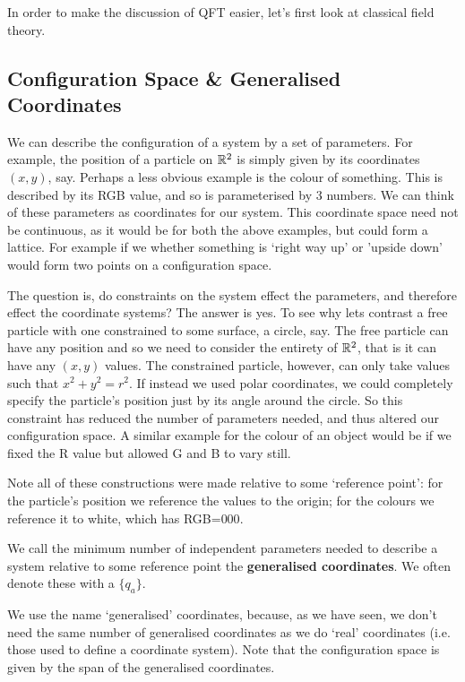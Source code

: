 In order to make the discussion of QFT easier, let's first look at classical field theory. 

\subsection{Configuration Space \& Generalised Coordinates}

We can describe the configuration of a system by a set of parameters. For example, the position of a particle on $\mathbb{R}^2$ is simply given by its coordinates $(x,y)$, say. Perhaps a less obvious example is the colour of something. This is described by its RGB value, and so is parameterised by 3 numbers. We can think of these parameters as coordinates for our system. This coordinate space need not be continuous, as it would be for both the above examples, but could form a lattice. For example if we whether something is `right way up' or 'upside down' would form two points on a configuration space. 

The question is, do constraints on the system effect the parameters, and therefore effect the coordinate systems? The answer is yes. To see why lets contrast a free particle with one constrained to some surface, a circle, say. The free particle can have any position and so we need to consider the entirety of $\mathbb{R}^2$, that is it can have any $(x,y)$ values. The constrained particle, however, can only take values such that $x^2+y^2=r^2$. If instead we used polar coordinates, we could completely specify the particle's position just by its angle around the circle. So this constraint has reduced the number of parameters needed, and thus altered our configuration space. A similar example for the colour of an object would be if we fixed the R value but allowed G and B to vary still. 

Note all of these constructions were made relative to some `reference point': for the particle's position we reference the values to the origin; for the colours we reference it to white, which has RGB=$000$.

    We call the minimum number of independent parameters needed to describe a system relative to some reference point the \textbf{generalised coordinates}. We often denote these with a $\{q_a\}$.
\ed 

We use the name `generalised' coordinates, because, as we have seen, we don't need the same number of generalised coordinates as we do `real' coordinates (i.e. those used to define a coordinate system). Note that the configuration space is given by the span of the generalised coordinates. 

